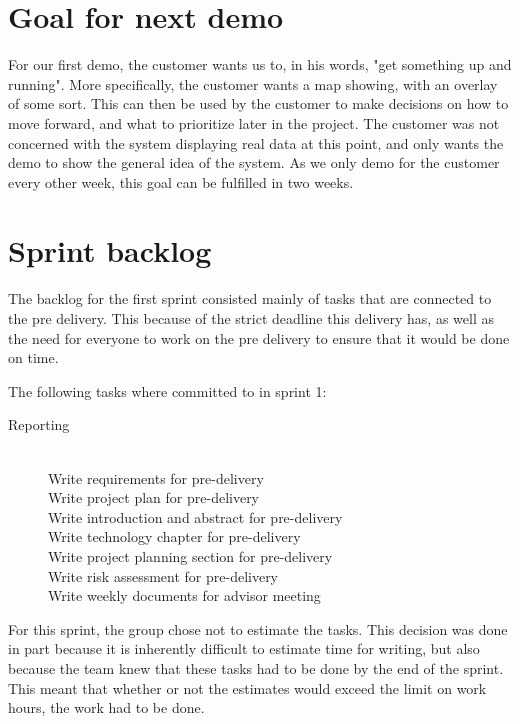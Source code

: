\documentclass[11pt,a4paper,titlepage,oneside]{report}
\begin{document}
\section{Goal for next demo}
For our first demo, the customer wants us to, in his words, "get something up and running". More specifically, the customer wants a map showing, with an overlay of some sort. This can then be used by the customer to make decisions on how to move forward, and what to prioritize later in the project. The customer was not concerned with the system displaying real data at this point, and only wants the demo to show the general idea of the system. As we only demo for the customer every other week, this goal can be fulfilled in two weeks.

\section{Sprint backlog}
The backlog for the first sprint consisted mainly of tasks that are connected to the pre delivery. This because of the strict deadline this delivery has, as well as the need for everyone to work on the pre delivery to ensure that it would be done on time.

The following tasks where committed to in sprint 1:

\begin{description}
	\item[Reporting] \hfill \\ 
	Write requirements for \gls{pre-delivery} \hfill \\
	Write project plan for \gls{pre-delivery} \hfill \\
	Write introduction and abstract for \gls{pre-delivery} \hfill \\
	Write technology chapter for \gls{pre-delivery} \hfill \\
	Write project planning section for \gls{pre-delivery} \hfill \\
	Write risk assessment for \gls{pre-delivery} \hfill \\
	Write weekly documents for advisor meeting
\end{description}

For this sprint, the group chose not to estimate the tasks. This decision was done in part because it is inherently difficult to estimate time for writing, but also because the team knew that these tasks had to be done by the end of the sprint. This meant that whether or not the estimates would exceed the limit on work hours, the work had to be done.
\end{document}
